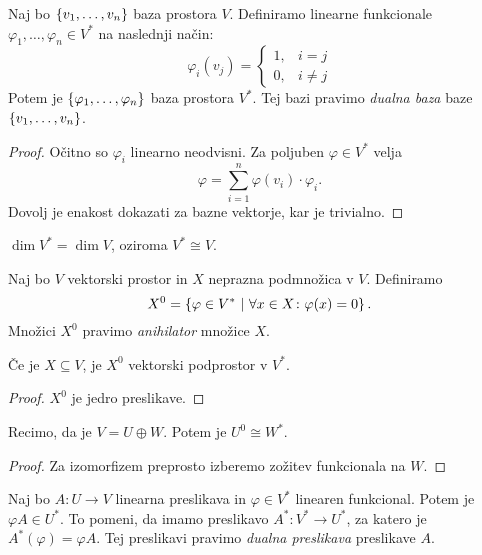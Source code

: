 \documentclass[12pt, a4paper]{article}
\begin{document}
\begin{izrek}
Naj bo $\left\{v_1,\dots,v_n\right\}$ baza prostora $V$. Definiramo linearne funkcionale $\varphi_1,\dots,\varphi_n\in V^*$ na naslednji način:
\[
\varphi_i(v_j)=
\begin{cases}
1, &i=j
\\
0, &i\ne j
\end{cases}
\]
Potem je $\left\{\varphi_1,\dots,\varphi_n\right\}$ baza prostora $V^*$. Tej bazi pravimo \emph{dualna baza} baze $\left\{v_1,\dots,v_n\right\}$.
\end{izrek}

\begin{proof}
Očitno so $\varphi_i$ linearno neodvisni. Za poljuben $\varphi\in V^*$ velja
\[
\varphi=\sum_{i=1}^n \varphi(v_i)\cdot\varphi_i.
\]
Dovolj je enakost dokazati za bazne vektorje, kar je trivialno.
\end{proof}

\begin{posledica}
$\dim V^*=\dim V$, oziroma $V^*\cong V$.
\end{posledica}

\begin{definicija}
Naj bo $V$ vektorski prostor in $X$ neprazna podmnožica v $V$. Definiramo
\[
X^0=\left\{\varphi\in V^*~\middle\vert~\forall x\in X\colon\varphi(x)=0\right\}.
\]
Množici $X^0$ pravimo \emph{anihilator} množice $X$.
\end{definicija}

\begin{trditev}
Če je $X\subseteq V$, je $X^0$ vektorski podprostor v $V^*$.
\end{trditev}

\begin{proof}
$X^0$ je jedro preslikave.
\end{proof}

\begin{trditev}\label{td:oplus}
Recimo, da je $V=U\oplus W$. Potem je $U^0\cong W^*$.
\end{trditev}

\begin{proof}
Za izomorfizem preprosto izberemo zožitev funkcionala na $W$.
\end{proof}

\begin{definicija}
Naj bo $A\colon U\to V$ linearna preslikava in $\varphi\in V^*$ linearen funkcional. Potem je $\varphi A\in U^*$. To pomeni, da imamo preslikavo $A^*\colon V^*\to U^*$, za katero je $A^*(\varphi)=\varphi A$. Tej preslikavi pravimo \emph{dualna preslikava} preslikave $A$.
\end{definicija}
\end{document}
